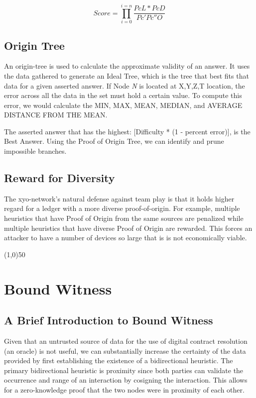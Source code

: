 \documentclass{article}
\begin{document}
\begin{equation*}\tag{1} \label{eq1}
Score = \prod_{i=0}^{i=n} \frac{PcL*PcD}{Pc' Pc'' O}
\end{equation*}

\subsection {Origin Tree}
An \Gls{origin-tree} is used to calculate the approximate validity of an answer. It uses the data gathered to generate an Ideal Tree, which is the tree that best fits that data for a given asserted answer. If Node \textit{N} is located at X,Y,Z,T location, the error across all the data in the set must hold a certain value. To compute this error, we would calculate the MIN, MAX, MEAN, MEDIAN, and AVERAGE DISTANCE FROM THE MEAN.

The asserted answer that has the highest: [Difficulty * (1 - percent error)], is the Best Answer. Using the Proof of Origin Tree, we can identify and prune impossible branches.

\subsection {Reward for Diversity}
The \Gls{xyo-network}'s natural defense against team play is that it holds higher regard for a ledger with a more diverse \Gls{proof-of-origin}. For example, multiple \glspl{heuristic} that have Proof of Origin from the same sources are penalized while multiple heuristics that have diverse Proof of Origin are rewarded. This forces an attacker to have a number of devices so large that is is not economically viable.

\begin{center}
\line(1,0){50}
\end{center}

\section {Bound Witness}

\subsection {A Brief Introduction to Bound Witness}
Given that an untrusted source of data for the use of digital contract resolution (an \gls{oracle}) is not useful, we can substantially increase the \gls{certainty} of the data provided by first establishing the existence of a bidirectional \gls{heuristic}. The primary bidirectional heuristic is proximity since both parties can validate the occurrence and range of an interaction by cosigning the interaction. This allows for a zero-knowledge proof that the two nodes were in proximity of each other.
\end{document}
